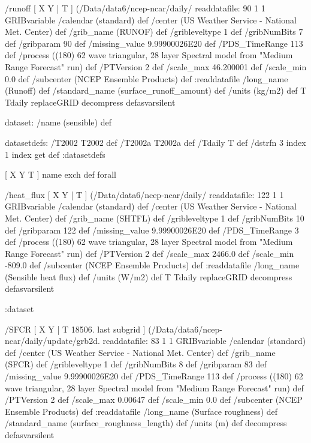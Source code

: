 \begin{ingrid}
  /runoff { [ X Y | T ] (/Data/data6/ncep-ncar/daily/%
  readdatafile:
  90 1 1 GRIBvariable
  /calendar (standard) def
  /center (US Weather Service - National Met. Center) def
  /grib_name (RUNOF) def
  /gribleveltype 1 def
  /gribNumBits 7 def
  /gribparam 90 def
  /missing_value 9.99900026E20 def 
  /PDS_TimeRange 113 def
  /process ((180) 62 wave triangular, 28 layer Spectral model from "Medium Range Forecast" run) def
  /PTVersion 2 def
  /scale_max 46.200001 def
  /scale_min 0.0 def
  /subcenter (NCEP Ensemble Products) def
  :readdatafile
  /long_name (Runoff) def
  /standard_name (surface_runoff_amount) def
  /units (kg/m2) def
  T Tdaily replaceGRID 
  decompress
  } defasvarsilent


  dataset: /name (sensible) def

   datasetdefs:
   /T2002 T2002 def
   /T2002a T2002a def
   /Tdaily T def
   /dstrfn 3 index 1 index get def
   :datasetdefs

   [ X Y T ] { name exch def } forall

   /heat_flux { [ X Y | T ] (/Data/data6/ncep-ncar/daily/%
   readdatafile:
   122 1 1 GRIBvariable
   /calendar (standard) def
   /center (US Weather Service - National Met. Center) def
   /grib_name (SHTFL) def
   /gribleveltype 1 def
   /gribNumBits 10 def
   /gribparam 122 def
   /missing_value 9.99900026E20 def 
   /PDS_TimeRange 3 def
   /process ((180) 62 wave triangular, 28 layer Spectral model from "Medium Range Forecast" run) def
   /PTVersion 2 def
   /scale_max 2466.0 def
   /scale_min -809.0 def
   /subcenter (NCEP Ensemble Products) def
   :readdatafile
   /long_name (Sensible heat flux) def
   /units (W/m2) def
   T Tdaily replaceGRID 
   decompress
   } defasvarsilent

  :dataset

  /SFCR { [ X Y | T 18506. last subgrid ] (/Data/data6/ncep-ncar/daily/update/grb2d.%
  readdatafile:
  83 1 1 GRIBvariable
  /calendar (standard) def
  /center (US Weather Service - National Met. Center) def
  /grib_name (SFCR) def
  /gribleveltype 1 def
  /gribNumBits 8 def
  /gribparam 83 def
  /missing_value 9.99900026E20 def 
  /PDS_TimeRange 113 def
  /process ((180) 62 wave triangular, 28 layer Spectral model from "Medium Range Forecast" run) def
  /PTVersion 2 def
  /scale_max 0.00647 def
  /scale_min 0.0 def
  /subcenter (NCEP Ensemble Products) def
  :readdatafile
  /long_name (Surface roughness) def
  /standard_name (surface_roughness_length) def
  /units (m) def
  decompress
  } defasvarsilent
 

\end{ingrid}
